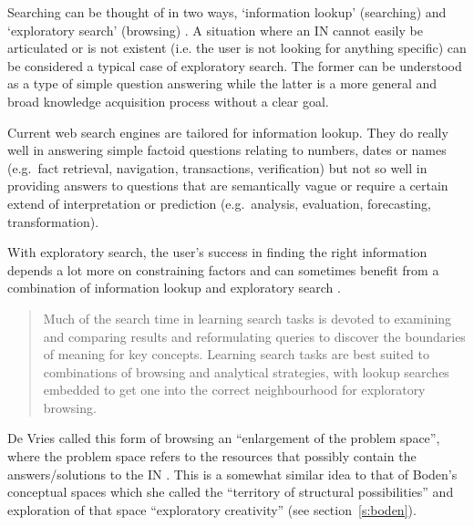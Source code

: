 Searching can be thought of in two ways, `information lookup' (searching) and `exploratory search' (browsing) \autocite{DeVries1993, Marchionini2006}. A situation where an \ac{IN} cannot easily be articulated or is not existent (i.e. the user is not looking for anything specific) can be considered a typical case of exploratory search. The former can be understood as a type of simple question answering while the latter is a more general and broad knowledge acquisition process without a clear goal.

Current web search engines are tailored for information lookup. They do really well in answering simple factoid questions relating to numbers, dates or names (e.g.\ fact retrieval, navigation, transactions, verification) but not so well in providing answers to questions that are semantically vague or require a certain extend of interpretation or prediction (e.g.\ analysis, evaluation, forecasting, transformation).

With exploratory search, the user’s success in finding the right information depends a lot more on constraining factors and can sometimes benefit from a combination of information lookup and exploratory search \autocite{Marchionini2006}.

\begin{quotation}
  Much of the search time in learning search tasks is devoted to examining and comparing results and reformulating queries to discover the boundaries of meaning for key concepts. Learning search tasks are best suited to combinations of browsing and analytical strategies, with lookup searches embedded to get one into the correct neighbourhood for exploratory browsing. 
\end{quotation}

De Vries called this form of browsing an ``enlargement of the problem space'', where the problem space refers to the resources that possibly contain the answers/solutions to the \ac{IN} \autocite*{DeVries1993}. This is a somewhat similar idea to that of Boden's conceptual spaces which she called the ``territory of structural possibilities'' and exploration of that space ``exploratory creativity'' \autocite{Boden2003} (see section~\ref{s:boden}).



